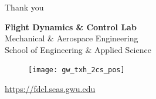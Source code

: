 \documentclass[11pt,professionalfonts]{beamer}
\begin{document}
\begin{frame}[c]{Thank you}
  \centering
  
  \textbf{\large Flight Dynamics \& Control Lab} \\
  Mechanical \& Aerospace Engineering \\
  School of Engineering \& Applied Science
  
  \begin{figure} %
        \texttt{[image: gw\_txh\_2cs\_pos]}
    \end{figure}
  
  \url{https://fdcl.seas.gwu.edu}
\end{frame}
\end{document}
